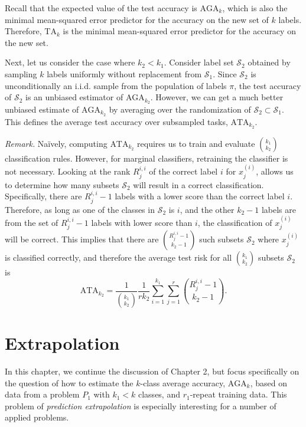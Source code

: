 \documentclass[12pt]{article}
\begin{document}
Recall that the expected value of the test accuracy is $\text{AGA}_k$,
which is also the minimal mean-squared error predictor for the accuracy on the
new set of $k$ labels.  Therefore, $\text{TA}_k$ is the minimal mean-squared error predictor for the accuracy on the new set.

Next, let us consider the case where $k_2 < k_1$.  
Consider label set $\mathcal{S}_2$ obtained
by sampling $k$ labels uniformly without replacement from
$\mathcal{S}_1$. Since $\mathcal{S}_2$ is unconditionally an i.i.d. sample from 
the population of labels $\pi$, the test accuracy of $\mathcal{S}_2$ is an unbiased estimator of $\text{AGA}_{k_2}$.
However, we can get a much better unbiased estimate of
$\text{AGA}_{k_2}$ by averaging over the randomization of
$\mathcal{S}_2 \subset \mathcal{S}_1$.  
This defines the average test accuracy over subsampled tasks, $\text{ATA}_{k_2}$.

\emph{Remark.}
Na\"{i}vely, computing $\text{ATA}_{k_2}$ requires us to train and evaluate
${k_1}\choose{k_2}$ classification rules.  However, for marginal classifiers, retraining the classifier is not necessary.
Looking at the rank $R_{j}^{i,i}$ of the correct label $i$ for $x_j^{(i)}$,
allows us to determine how many subsets $\mathcal{S}_2$
will result in a correct classification. Specifically,
there are $R_{j}^{i,i} - 1$ labels with a lower score than the correct
label $i$.  Therefore, as long as one of the classes in
$\mathcal{S}_2$ is $i$, and the other $k_2-1$ labels are from the set of
$R_{j}^{i,i}-1$ labels with lower score than $i$, the classification of
$x_j^{(i)}$ will be correct.  This implies that there are
${R_{j}^{i,i}-1}\choose{k_2-1}$ such subsets $\mathcal{S}_2$ where
$x_j^{(i)}$ is classified correctly, and therefore the average test risk for all ${k_1}\choose{k_2}$ subsets $\mathcal{S}_2$ is
\begin{equation}\label{eq:avtestrisk}
\text{ATA}_{k_2} = \frac{1}{{{k_1}\choose{k_2}}}\frac{1}{r k_2} \sum_{i=1}^{k_1} \sum_{j=1}^{r} {{R_{j}^{i,i}-1}\choose{k_2-1}}.
\end{equation}

\section{Extrapolation}

In this chapter, we continue the discussion of Chapter 2, but focus
specifically on the question of how to estimate the $k$-class
average accuracy, $\text{AGA}_{k}$, based on data from a problem
$P_1$ with $k_1 < k$ classes, and $r_1$-repeat training data.
This problem of \emph{prediction extrapolation} is especially
interesting for a number of applied problems.
\end{document}
